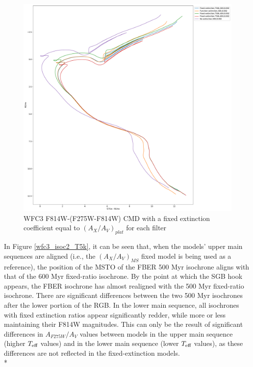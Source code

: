 \documentclass[12pt, a4paper]{report}
\begin{document}
\begin{figure}[h]
\begin{center}
\includegraphics[scale=0.25]{../basti_isochrones_10_13Gyr/Extinction_T50k_FeH0fix_func_f814w_f275wmf814w_500_400_600_Myr_FeH_0p002_ref_noext_Av_1p0.pdf}
\caption{WFC3 F814W-(F275W-F814W) CMD with a fixed extinction coefficient equal to $(A_{X}/A_{V})_{plat}$ for each filter}
\label{wfc3_isoc2_T50k}
\end{center}
\end{figure}

In Figure \ref{wfc3_isoc2_T5k}, it can be seen that, when the models' upper main sequences are aligned (i.e., the $(A_{X}/A_{V})_{MS}$ fixed model is being used as a reference), the position of the MSTO of the FBER 500 Myr isochrone aligns with that of the 600 Myr fixed-ratio isochrone. By the point at which the SGB hook \citep{1998MNRAS.298..525P} appears, the FBER isochrone has almost realigned with the 500 Myr fixed-ratio isochrone. There are significant differences between the two 500 Myr isochrones after the lower portion of the RGB. In the lower main sequence, all isochrones with fixed extinction ratios appear significantly redder, while more or less maintaining their F814W magnitudes. This can only be the result of significant differences in $A_{F275W}/A_{V}$ values between models in the upper main sequence (higher $T_{\textnormal{eff}}$ values) and in the lower main sequence (lower $T_{\textnormal{eff}}$ values), as these differences are not reflected in the fixed-extinction models. \\*
\end{document}
